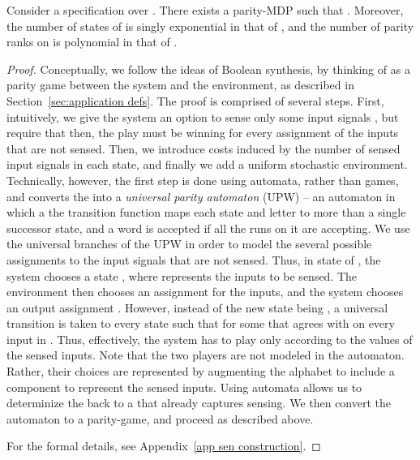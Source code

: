 \documentclass[runningheads,a4paper]{llncs}
\begin{document}
\vspace*{-5pt}
\begin{theorem}
\label{thm:sensing to parity-MDP}
Consider a  specification  over . There exists a parity-MDP  such that .	
Moreover, the number of states of  is singly exponential in that of , and the number of parity ranks on  is polynomial in that of .
\end{theorem}
\vspace*{-10pt}
\begin{proof}
Conceptually, we follow the ideas of Boolean synthesis, by thinking of  as a parity game between the system and the environment, as described in Section~\ref{sec:application defs}. The proof is comprised of several steps. First, intuitively, we give the system an option to sense only some input signals , but require that then, the play must be winning for every assignment of the inputs that are not sensed. Then, we introduce costs induced by the number of sensed input signals in each state, and finally we add a uniform stochastic environment. 
Technically, however, the first step is done using automata, rather than games, and converts the   into a {\em universal parity automaton\/} (UPW) -- an automaton in which a the transition function maps each state and letter to more than a single successor state, and a word is accepted if all the runs on it are accepting. We use the universal branches of the UPW in order to model the several possible assignments to the input signals that are not sensed. Thus, in state  of , the system chooses a state , where  represents the inputs to be sensed. The environment then chooses an assignment  for the inputs, and the system chooses an output assignment . However, instead of the new state being , a universal transition is taken to every state  such that  for some   that agrees with  on every input in . Thus, effectively, the system has to play only according to the values of the sensed inputs. Note that the two players are not modeled in the automaton. Rather, their choices are represented by augmenting the alphabet to include a  component to represent the sensed inputs.
Using automata allows us to determinize the  back to a  that already captures sensing. We then convert the automaton to a parity-game, and proceed as described above.

For the formal details, see Appendix~\ref{app sen construction}.
\end{proof}
\end{document}
